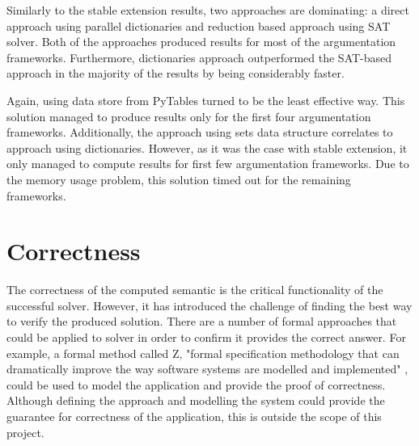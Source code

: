 Similarly to the stable extension results, two approaches are dominating: a direct approach using parallel dictionaries and reduction based approach using SAT solver. Both of the approaches produced results for most of the argumentation frameworks. Furthermore, dictionaries approach outperformed the SAT-based approach in the majority of the results by being considerably faster.


Again, using data store from PyTables turned to be the least effective way. This solution managed to produce results only for the first four argumentation frameworks. Additionally, the approach using sets data structure correlates to approach using dictionaries. However, as it was the case with stable extension, it only managed to compute results for first few argumentation frameworks. Due to the memory usage problem, this solution timed out for the remaining frameworks.


\section{Correctness}
The correctness of the computed semantic is the critical functionality of the successful solver. However, it has introduced the challenge of finding the best way to verify the produced solution. There are a number of formal approaches that could be applied to solver in order to confirm it provides the correct answer. For example, a formal method called Z, "formal specification methodology that can dramatically improve the way software systems are modelled and implemented" \citep{potter1996introduction}, could be used to model the application and provide the proof of correctness. Although defining the approach and modelling the system could provide the guarantee for correctness of the application, this is outside the scope of this project. 

